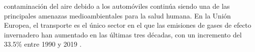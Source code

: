 \documentclass[10pt,journal,compsoc]{IEEEtran}
\begin{document}
%
\IEEEpeerreviewmaketitle







% 
% 
% 
% 
 contaminación del aire debido a los automóviles continúa siendo una de las principales amenazas medioambientales para la salud humana. En la Unión Europea, el transporte es el único sector en el que las emisiones de gases de efecto invernadero han aumentado en las últimas tres décadas, con un incremento del 33.5\% entre 1990 y 2019 \cite{stats}.
\end{document}
